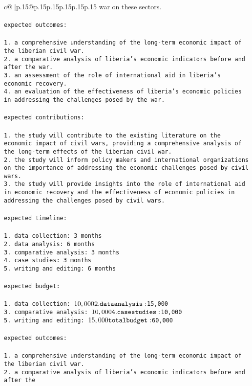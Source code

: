 \documentclass{article}
\begin{document}
{\begin{supertabular}{c@{$\;$}|p{.15\linewidth}@{}p{.15\linewidth}p{.15\linewidth}p{.15\linewidth}p{.15\linewidth}p{.15\linewidth}}
{{{war on these sectors.\\ \tt \\ \tt expected outcomes:\\ \tt \\ \tt 1. a comprehensive understanding of the long-term economic impact of the liberian civil war.\\ \tt 2. a comparative analysis of liberia's economic indicators before and after the war.\\ \tt 3. an assessment of the role of international aid in liberia's economic recovery.\\ \tt 4. an evaluation of the effectiveness of liberia's economic policies in addressing the challenges posed by the war.\\ \tt \\ \tt expected contributions:\\ \tt \\ \tt 1. the study will contribute to the existing literature on the economic impact of civil wars, providing a comprehensive analysis of the long-term effects of the liberian civil war.\\ \tt 2. the study will inform policy makers and international organizations on the importance of addressing the economic challenges posed by civil wars.\\ \tt 3. the study will provide insights into the role of international aid in economic recovery and the effectiveness of economic policies in addressing the challenges posed by civil wars.\\ \tt \\ \tt expected timeline:\\ \tt \\ \tt 1. data collection: 3 months\\ \tt 2. data analysis: 6 months\\ \tt 3. comparative analysis: 3 months\\ \tt 4. case studies: 3 months\\ \tt 5. writing and editing: 6 months\\ \tt \\ \tt expected budget:\\ \tt \\ \tt 1. data collection: $10,000\\ \tt 2. data analysis: $15,000\\ \tt 3. comparative analysis: $10,000\\ \tt 4. case studies: $10,000\\ \tt 5. writing and editing: $15,000\\ \tt \\ \tt total budget: $60,000\\ \tt \\ \tt expected outcomes:\\ \tt \\ \tt 1. a comprehensive understanding of the long-term economic impact of the liberian civil war.\\ \tt 2. a comparative analysis of liberia's economic indicators before and after the }}}
\end{supertabular}}
\end{document}
